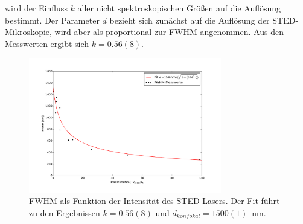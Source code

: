 wird der Einfluss $k$ aller nicht spektroskopischen Größen auf die Auflösung bestimmt.
Der Parameter $d$ bezieht sich zunächst auf die Auflösung der STED-Mikroskopie, wird aber als proportional zur FWHM angenommen.
Aus den Messwerten ergibt sich $k = 0.56(8)$.
\begin{figure}
	\centering
	\includegraphics[width=0.75\textwidth]{plots/fwhm_zeta.pdf}
	\caption{FWHM als Funktion der Intensität des STED-Lasers. Der Fit führt zu den Ergebnissen $k = 0.56(8)$ und $d_{konfokal} = 1500(1)$~nm. 
	}\label{fig:sted_res}
\end{figure}
